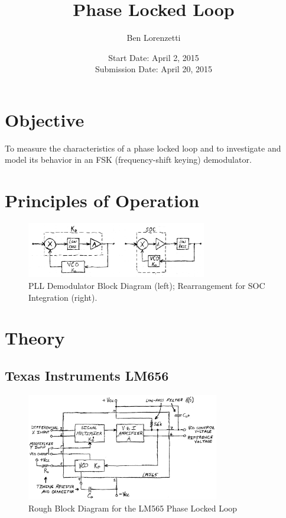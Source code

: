 \documentclass[titlepage, letterpaper, 10.5pt]{article}
\begin{document}
\title{Phase Locked Loop}
\author{Ben Lorenzetti}
\date{Start Date: April 2, 2015\\
Submission Date: April 20, 2015}
\maketitle

\clearpage
\mbox{}
\thispagestyle{empty}
\clearpage
\setcounter{page}{1}

\tableofcontents

\section{Objective}

To measure the characteristics of a phase locked loop and to investigate and model its behavior in an FSK (frequency-shift keying) demodulator.

\clearpage
\section{Principles of Operation}
\label{principles-of-operation}

\begin{figure}[ht]
	\centering
	\includegraphics[width=0.7\textwidth]{diagrams/pll-demodulator-block-diagram}
	\caption{PLL Demodulator Block Diagram (left); Rearrangement for SOC Integration (right).}
	\label{pll-demodulator-block-diagram}
\end{figure}

\clearpage
\section{Theory}

\subsection{Texas Instruments LM656}

\begin{figure}[ht]
	\centering
	\includegraphics[width=0.75\textwidth]{diagrams/565-block-diagram}
	\caption{Rough Block Diagram for the LM565 Phase Locked Loop}
	\label{565-block-diagram}
\end{figure}
\end{document}
